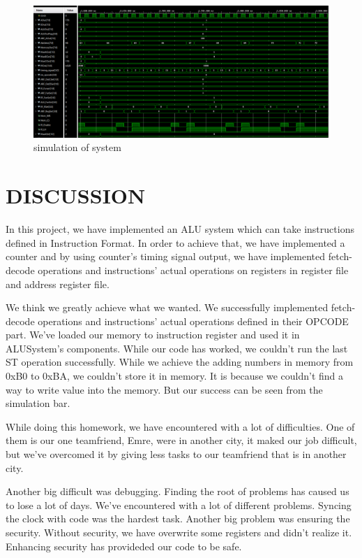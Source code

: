 \documentclass[pdftex,12pt,a4paper]{article}
\begin{document}
\begin{figure}[H]
    \centering
    \includegraphics[width=1\textwidth]{photos/system_result_13.png}	
    \caption{simulation of system}
    \label{implementation}
\end{figure}



\section{DISCUSSION}
    In this project, we have implemented an ALU system which can take instructions defined in
Instruction Format. In order to achieve that, we have implemented a counter and by using counter's 
timing signal output, we have implemented fetch-decode operations and instructions' actual operations on
registers in register file and address register file. 

    We think we greatly achieve what we wanted. We successfully implemented fetch-decode operations
and instructions' actual operations defined in their OPCODE part. We've loaded our memory to instruction
register and used it in ALUSystem's components. While our code has worked, we couldn't run the last ST
operation successfully. While we achieve the adding numbers in memory from 0xB0 to 0xBA, we couldn't store it
in memory. It is because we couldn't find a way to write value into the memory. But our success can be seen
from the simulation bar.

    While doing this homework, we have encountered with a lot of difficulties. One of them is our one teamfriend, Emre,
were in another city, it maked our job difficult, but we've overcomed it by giving less tasks to our teamfriend
that is in another city.

    Another big difficult was debugging. Finding the root of problems has caused us to lose a lot of days.
We've encountered with a lot of different problems. Syncing the clock with code was the hardest task.
Another big problem was ensuring the security. Without security, we have overwrite some registers and
didn't realize it. Enhancing security has provideded our code to be safe. 
\end{document}
